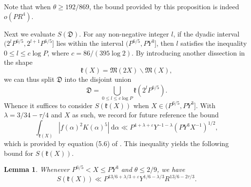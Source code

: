 \documentclass[12pt,english,reqno]{amsart}
\theoremstyle{definition}
\theoremstyle{remark}
\numberwithin{equation}{section}
\numberwithin{equation}{section}
\numberwithin{figure}{section}
\theoremstyle{plain}
\theoremstyle{plain}
\theoremstyle{plain}
\newtheorem{lem}[thm]{Lemma}
\theoremstyle{plain}
\numberwithin{equation}{section}
\numberwithin{thm}{section}
\begin{document}
Note that when $\theta\geq192/869$, the bound provided by this proposition is indeed $o(PR^{4})$.
\par Next we evaluate $S(\mathfrak{D})$. For any non-negative integer
$l$, if the dyadic interval $(2^{l}P^{6/5},2^{l+1}P^{6/5}]$ lies
within the interval $(P^{6/5},PY^{3}]$, then $l$ satisfies the inequality
$0\leq l\leq c\log P$, where $c=86/(395\log2)$. By introducing another
dissection in the shape
\begin{equation}
\mathfrak{k}(X)=\mathfrak{M}(2X)\backslash\mathfrak{M}(X),\label{eq:k(X)}\end{equation}
we can thus split $\mathfrak{D}$ into the disjoint union
\begin{equation}
\mathfrak{D}=\bigcup_{0\leq l\leq c\log P}\mathfrak{k}(2^{l}P^{6/5}).\label{eq:splitting D}\end{equation}
Whence it suffices to consider $S(\mathfrak{k}(X))$ when $X\in(P^{6/5},PY^{3}]$.
With $\lambda=3/34-\tau/4$ and $X$ as such, we record for future
reference the bound
\begin{equation}
\int_{\mathfrak{k}(X)}|f(\alpha)^{2}K(\alpha)^{5}|\:\mathrm{d}\alpha\ll P^{4+\lambda+\varepsilon}Y^{-1-\lambda}(PY^{3}X^{-1})^{1/2},\label{eq:estimate for f^2K^5}\end{equation}
which is provided by equation (5.6) of \cite{BrudernWooley2009}.
This inequality yields the following bound for $S(\mathfrak{k}(X))$.
\begin{lem}
\label{lem:estimate for S(k(X))}Whenever $P^{6/5}<X\leq PY^{3}$ and $\theta\leq2/9$,
we have
\[
S(\mathfrak{k}(X))\ll P^{13/6+\lambda/3+\varepsilon}Y^{1/6-\lambda/3}R^{13/6-2\tau/3}.\]
\end{lem}
\end{document}
